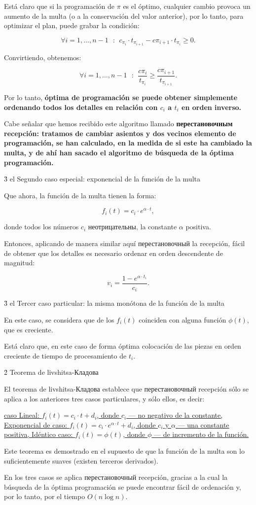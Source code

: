 Está claro que si la programación de $\pi$ es el óptimo, cualquier cambio provoca un aumento de la multa (o a la conservación del valor anterior), por lo tanto, para optimizar el plan, puede grabar la condición:

$$ \forall i=1, \ldots, n-1 ~~~:~~ c_{\pi_i} \cdot t_{\pi_{i+1}} - c{\pi_{i+1}} \cdot t_{\pi_i} \ge 0. $$

Convirtiendo, obtenemos:

$$ \forall i=1, \ldots, n-1 ~~~:~~ \frac{ c{\pi_i} }{ t_{\pi_i} } \ge \frac{ c{\pi_{i+1}} }{ t_{\pi_{i+1}} }. $$

Por lo tanto, \bf{óptima de programación} se puede obtener simplemente \bf{ordenando} todos los detalles en relación con $c_i$ a $t_i$ en orden inverso.

Cabe señalar que hemos recibido este algoritmo llamado \bf{перестановочным recepción}: tratamos de cambiar asientos y dos vecinos elemento de programación, se han calculado, en la medida de si este ha cambiado la multa, y de ahí han sacado el algoritmo de búsqueda de la óptima programación.


\h3{ el Segundo caso especial: exponencial de la función de la multa }

Que ahora, la función de la multa tienen la forma:

$$ f_i(t) = c_i \cdot e^{\alpha \cdot t}, $$

donde todos los números $c_i$ неотрицательны, la constante $\alpha$ positiva.

Entonces, aplicando de manera similar aquí перестановочный la recepción, fácil de obtener que los detalles es necesario ordenar en orden descendente de magnitud:

$$ v_i = \frac{ 1 - e^{ \alpha \cdot t_i } }{ c_i }. $$


\h3{ el Tercer caso particular: la misma monótona de la función de la multa }

En este caso, se considera que de los $f_i(t)$ coinciden con alguna función $\phi(t)$, que es creciente.

Está claro que, en este caso de forma óptima colocación de las piezas en orden creciente de tiempo de procesamiento de $t_i$.


\h2{ Teorema de livshitsa-Кладова }

El teorema de livshitsa-Кладова establece que перестановочный recepción sólo se aplica a los anteriores tres casos particulares, y sólo ellos, es decir:

\ul{
\li caso Lineal: $f_i(t) = c_i \cdot t + d_i$, donde $c_i$ --- no negativo de la constante,
\li Exponencial de caso: $f_i(t) = c_i \cdot e^{\alpha \cdot t} + d_i$, donde $c_i$ y $\alpha$ --- una constante positiva,
\li Idéntico caso: $f_i(t) = \phi(t)$, donde $\phi$ --- de incremento de la función.
}

Este teorema es demostrado en el supuesto de que la función de la multa son lo suficientemente suaves (existen terceros derivados).

En los tres casos se aplica перестановочный recepción, gracias a la cual la búsqueda de la óptima programación se puede encontrar fácil de ordenación y, por lo tanto, por el tiempo $O (n \log n)$.

